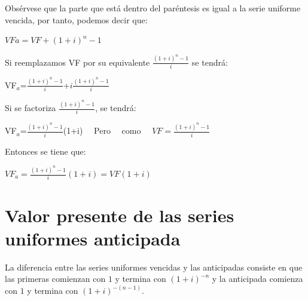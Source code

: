 	Obsérvese que la parte que está dentro del paréntesis es igual a la serie uniforme vencida, por tanto, podemos decir que:

	\vspace{5mm}
 \begin{center}
$VFa=VF+(1+i)^{n}-1$
\end{center}
	\vspace{5mm}

	Si reemplazamos VF por su equivalente $\frac{(1+i)^{n}-1}{i}$ se tendrá:

	\vspace{5mm}
 \begin{center}
	VF$_{a}$=$\frac{(1+i)^{n}-1}{i}$+$i\frac{(1+i)^{n}-1}{i}$
 \end{center}
	\vspace{5mm}

	Si se factoriza  $\frac{(1+i)^{n}-1}{i}$, se tendrá:

	\vspace{5mm}
 \begin{center}
	VF$_{a}$=$\frac{(1+i)^{n}-1}{i}$(1+i) \ \  Pero \ \ como \ \ $VF = \frac{(1+i)^{n}-1}{i}$
 \end{center}
	\vspace{5mm}

	Entonces se tiene que:

	\vspace{5mm}
 \begin{center}
$VF_{a}=\frac{(1+i)^{n}-1}{i}(1+i) = VF (1+i)$  \hspace{35pt}{ Valor  futuro  serie  uniforme  anticipada}
\end{center}

	\vspace{5mm}






	\section{Valor presente de las series uniformes anticipada}

	La diferencia entre las series uniformes vencidas y las anticipadas consiste en que las primeras comienzan con $1$ y termina con $(1+i)^{-n}$ y la anticipada comienza con $1$ y termina con $(1+i)^{-(n-1)}$.

